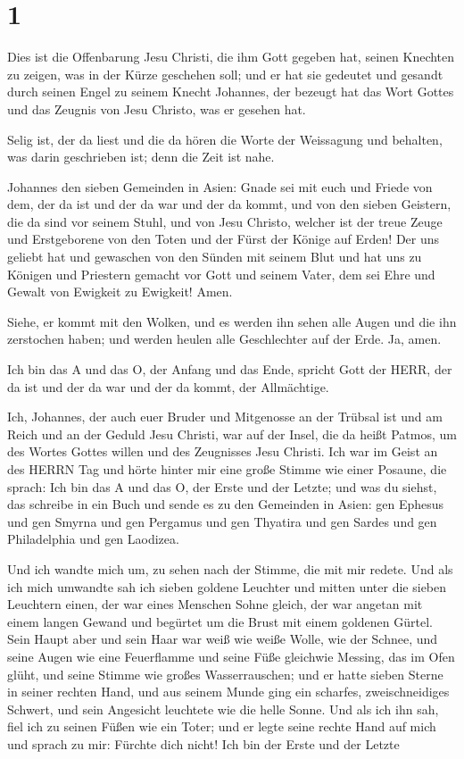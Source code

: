 \hypertarget{section}{%
\section{1}\label{section}}

 Dies ist die Offenbarung Jesu Christi, die ihm Gott gegeben
hat, seinen Knechten zu zeigen, was in der Kürze geschehen soll; und er
hat sie gedeutet und gesandt durch seinen Engel zu seinem Knecht
Johannes,  der bezeugt hat das Wort Gottes und das Zeugnis
von Jesu Christo, was er gesehen hat.

 Selig ist, der da liest und die da hören die Worte der
Weissagung und behalten, was darin geschrieben ist; denn die Zeit ist
nahe.

 Johannes den sieben Gemeinden in Asien: Gnade sei mit euch
und Friede von dem, der da ist und der da war und der da kommt, und von
den sieben Geistern, die da sind vor seinem Stuhl,  und von
Jesu Christo, welcher ist der treue Zeuge und Erstgeborene von den Toten
und der Fürst der Könige auf Erden! Der uns geliebt hat und gewaschen
von den Sünden mit seinem Blut  und hat uns zu Königen und
Priestern gemacht vor Gott und seinem Vater, dem sei Ehre und Gewalt von
Ewigkeit zu Ewigkeit! Amen.

 Siehe, er kommt mit den Wolken, und es werden ihn sehen
alle Augen und die ihn zerstochen haben; und werden heulen alle
Geschlechter auf der Erde. Ja, amen.

 Ich bin das A und das O, der Anfang und das Ende, spricht
Gott der HERR, der da ist und der da war und der da kommt, der
Allmächtige.

 Ich, Johannes, der auch euer Bruder und Mitgenosse an der
Trübsal ist und am Reich und an der Geduld Jesu Christi, war auf der
Insel, die da heißt Patmos, um des Wortes Gottes willen und des
Zeugnisses Jesu Christi.  Ich war im Geist an des HERRN Tag
und hörte hinter mir eine große Stimme wie einer Posaune, 
die sprach: Ich bin das A und das O, der Erste und der Letzte; und was
du siehst, das schreibe in ein Buch und sende es zu den Gemeinden in
Asien: gen Ephesus und gen Smyrna und gen Pergamus und gen Thyatira und
gen Sardes und gen Philadelphia und gen Laodizea.

 Und ich wandte mich um, zu sehen nach der Stimme, die mit
mir redete. Und als ich mich umwandte sah ich sieben goldene Leuchter
 und mitten unter die sieben Leuchtern einen, der war eines
Menschen Sohne gleich, der war angetan mit einem langen Gewand und
begürtet um die Brust mit einem goldenen Gürtel.  Sein
Haupt aber und sein Haar war weiß wie weiße Wolle, wie der Schnee, und
seine Augen wie eine Feuerflamme  und seine Füße gleichwie
Messing, das im Ofen glüht, und seine Stimme wie großes Wasserrauschen;
 und er hatte sieben Sterne in seiner rechten Hand, und aus
seinem Munde ging ein scharfes, zweischneidiges Schwert, und sein
Angesicht leuchtete wie die helle Sonne.  Und als ich ihn
sah, fiel ich zu seinen Füßen wie ein Toter; und er legte seine rechte
Hand auf mich und sprach zu mir: Fürchte dich nicht! Ich bin der Erste
und der Letzte

